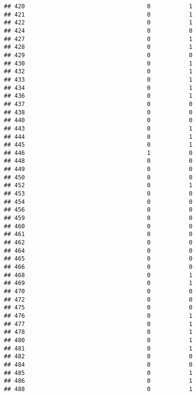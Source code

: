 \documentclass[
]{article}
\begin{document}
\begin{verbatim}
## 420                                   0           1
## 421                                   0           1
## 422                                   0           1
## 424                                   0           0
## 427                                   0           1
## 428                                   0           1
## 429                                   0           0
## 430                                   0           1
## 432                                   0           1
## 433                                   0           1
## 434                                   0           1
## 436                                   0           1
## 437                                   0           0
## 438                                   0           0
## 440                                   0           0
## 443                                   0           1
## 444                                   0           1
## 445                                   0           1
## 446                                   1           0
## 448                                   0           0
## 449                                   0           0
## 450                                   0           0
## 452                                   0           1
## 453                                   0           0
## 454                                   0           0
## 456                                   0           0
## 459                                   0           0
## 460                                   0           0
## 461                                   0           0
## 462                                   0           0
## 464                                   0           0
## 465                                   0           0
## 466                                   0           0
## 468                                   0           1
## 469                                   0           1
## 470                                   0           0
## 472                                   0           0
## 475                                   0           0
## 476                                   0           1
## 477                                   0           1
## 478                                   0           1
## 480                                   0           1
## 481                                   0           1
## 482                                   0           0
## 484                                   0           0
## 485                                   0           1
## 486                                   0           1
## 488                                   0           1

\end{verbatim}
\end{document}

